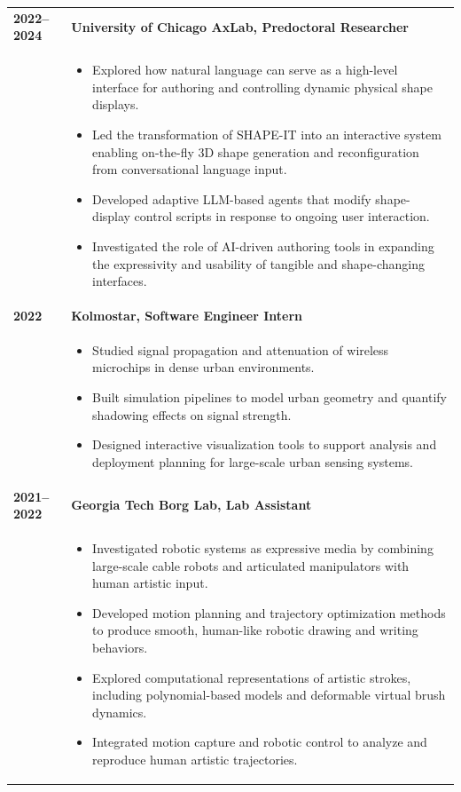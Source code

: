 \documentclass[12pt, letterpaper]{article}
\newlength{\datecolwidth}
\begin{document}
\noindent
\begin{tabularx}{\textwidth}{@{}p{\datecolwidth} X@{}}
    \textbf{2022--2024} & \textbf{University of Chicago AxLab, Predoctoral Researcher} \\
    & \begin{itemize}[leftmargin=*, nosep, after=\vspace{4pt}]
        \item Explored how natural language can serve as a high-level interface for authoring and controlling dynamic physical shape displays.
        \item Led the transformation of SHAPE-IT into an interactive system enabling on-the-fly 3D shape generation and reconfiguration from conversational language input.
        \item Developed adaptive LLM-based agents that modify shape-display control scripts in response to ongoing user interaction.
        \item Investigated the role of AI-driven authoring tools in expanding the expressivity and usability of tangible and shape-changing interfaces.
    \end{itemize} \\

    \textbf{2022} & \textbf{Kolmostar, Software Engineer Intern} \\
    & \begin{itemize}[leftmargin=*, nosep, after=\vspace{4pt}]
        \item Studied signal propagation and attenuation of wireless microchips in dense urban environments.
        \item Built simulation pipelines to model urban geometry and quantify shadowing effects on signal strength.
        \item Designed interactive visualization tools to support analysis and deployment planning for large-scale urban sensing systems.
    \end{itemize} \\

    \textbf{2021--2022} & \textbf{Georgia Tech Borg Lab, Lab Assistant} \\
    & \begin{itemize}[leftmargin=*, nosep, after=\vspace{4pt}]
        \item Investigated robotic systems as expressive media by combining large-scale cable robots and articulated manipulators with human artistic input.
        \item Developed motion planning and trajectory optimization methods to produce smooth, human-like robotic drawing and writing behaviors.
        \item Explored computational representations of artistic strokes, including polynomial-based models and deformable virtual brush dynamics.
        \item Integrated motion capture and robotic control to analyze and reproduce human artistic trajectories.
    \end{itemize} \\


\end{tabularx}
\end{document}
